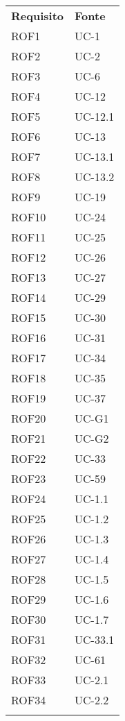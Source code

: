 \begin{longtable}{| p{5cm} | p{5cm} |}
		\rowcolor{LightBlue}
		\color{white}\bfseries Requisito & \color{white}\bfseries Fonte \\[0.25cm]
		\rowcolor{LightGray}
		ROF1 & UC-1\\
		ROF2 & UC-2\\
		\rowcolor{LightGray}
		ROF3 & UC-6\\
		ROF4 & UC-12\\
		\rowcolor{LightGray}
		ROF5 & UC-12.1\\
		ROF6 & UC-13\\
		\rowcolor{LightGray}
		ROF7 & UC-13.1\\
		ROF8 & UC-13.2\\
		\rowcolor{LightGray}
		ROF9 & UC-19\\
		ROF10 & UC-24\\
		\rowcolor{LightGray}
		ROF11 & UC-25\\
		ROF12 & UC-26\\
		\rowcolor{LightGray}
		ROF13 & UC-27\\
		ROF14 & UC-29\\
		\rowcolor{LightGray}
		ROF15 & UC-30\\
		ROF16 & UC-31\\
		\rowcolor{LightGray}
		ROF17 & UC-34\\
		ROF18 & UC-35\\
		\rowcolor{LightGray}
		ROF19 & UC-37\\
		ROF20 & UC-G1\\
		\rowcolor{LightGray}
		ROF21 & UC-G2\\
		ROF22 & UC-33\\
		\rowcolor{LightGray}
		ROF23 & UC-59\\
		ROF24 & UC-1.1\\
		\rowcolor{LightGray}
		ROF25 & UC-1.2\\
		ROF26 & UC-1.3\\
		\rowcolor{LightGray}
		ROF27 & UC-1.4\\
		ROF28 & UC-1.5\\
		\rowcolor{LightGray}
		ROF29 & UC-1.6\\
		ROF30 & UC-1.7\\
		\rowcolor{LightGray}
		ROF31 & UC-33.1\\
		ROF32 & UC-61\\
		\rowcolor{LightGray}
		ROF33 & UC-2.1\\
		ROF34 & UC-2.2\\
		\rowcolor{LightGray}

\end{longtable}
